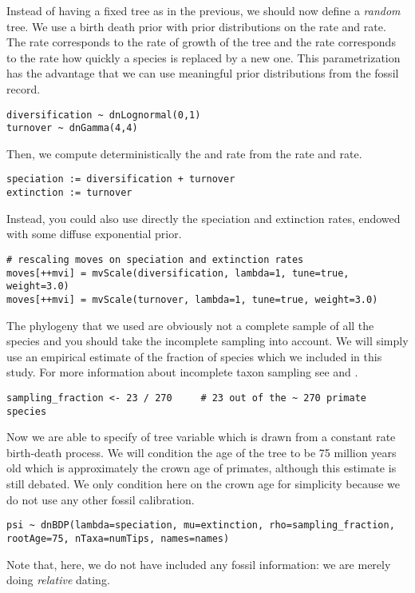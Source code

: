 Instead of having a fixed tree as in the previous, we should now define a \emph{random} tree. We use a birth death prior with prior distributions on the  rate and  rate.
The  rate corresponds to the rate of growth of the tree and the  rate corresponds to the rate how quickly a species is replaced by a new one.
This parametrization has the advantage that we can use meaningful prior distributions from the fossil record.
{\tt \small \begin{snugshade*}
\begin{lstlisting}
diversification ~ dnLognormal(0,1)
turnover ~ dnGamma(4,4)
\end{lstlisting}
\end{snugshade*}}
Then, we compute deterministically the  and  rate from the  rate and  rate.
{\tt \small \begin{snugshade*}
\begin{lstlisting}
speciation := diversification + turnover
extinction := turnover
\end{lstlisting}
\end{snugshade*}}
Instead, you could also use directly the speciation and extinction rates, \EG endowed with some diffuse exponential prior.
{\tt \small \begin{snugshade*}
\begin{lstlisting}
# rescaling moves on speciation and extinction rates
moves[++mvi] = mvScale(diversification, lambda=1, tune=true, weight=3.0)
moves[++mvi] = mvScale(turnover, lambda=1, tune=true, weight=3.0)
\end{lstlisting}
\end{snugshade*}}
The phylogeny that we used are obviously not a complete sample of all the species and you should take the incomplete sampling into account. We will simply use an empirical estimate of the fraction of species which we included in this study. For more information about incomplete taxon sampling see \cite{Hohna2011} and \cite{Hohna2014a}. 
{\tt \small \begin{snugshade*}
\begin{lstlisting}
sampling_fraction <- 23 / 270     # 23 out of the ~ 270 primate species
\end{lstlisting}
\end{snugshade*}}
Now we are able to specify of tree variable  which is drawn from a constant rate birth-death process. We will condition the age of the tree to be 75 million years old which is approximately the crown age of primates, although this estimate is still debated. We only condition here on the crown age for simplicity because we do not use any other fossil calibration.
{\tt \small \begin{snugshade*}
\begin{lstlisting}
psi ~ dnBDP(lambda=speciation, mu=extinction, rho=sampling_fraction, rootAge=75, nTaxa=numTips, names=names)
\end{lstlisting}
\end{snugshade*}}
Note that, here, we do not have included any fossil information: we are merely doing \emph{relative} dating. 

